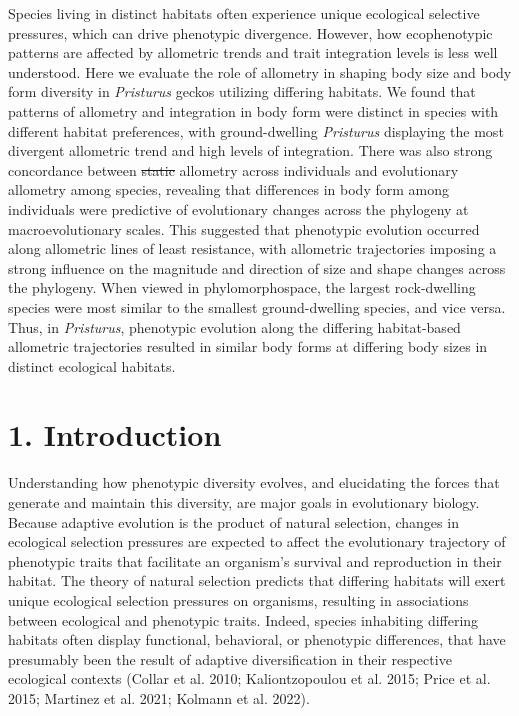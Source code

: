 \documentclass[
  11pt,
]{article}
\providecommand{\DIFaddtex}[1]{{\protect\color{blue}\uwave{#1}}} %
\providecommand{\DIFdeltex}[1]{{\protect\color{red}\sout{#1}}}                      %
\providecommand{\DIFaddbegin}{} %
\providecommand{\DIFaddend}{} %
\providecommand{\DIFdelbegin}{} %
\providecommand{\DIFdelend}{} %
\providecommand{\DIFadd}[1]{\texorpdfstring{\DIFaddtex{#1}}{#1}} %
\providecommand{\DIFdel}[1]{\texorpdfstring{\DIFdeltex{#1}}{}} %
\newcommand{\DIFscaledelfig}{0.5}
\newlength{\DIFdelgraphicswidth} %
\newlength{\DIFdelgraphicsheight} %
\newcommand{\DIFaddincludegraphics}[2][]{{\color{blue}\fbox{\DIFOincludegraphics[#1]{#2}}}} %
\newcommand{\DIFdelincludegraphics}[2][]{%
\sbox{\DIFdelgraphicsbox}{\DIFOincludegraphics[#1]{#2}}%
\settoboxwidth{\DIFdelgraphicswidth}{\DIFdelgraphicsbox} %
\settoboxtotalheight{\DIFdelgraphicsheight}{\DIFdelgraphicsbox} %
\scalebox{\DIFscaledelfig}{%
\parbox[b]{\DIFdelgraphicswidth}{\usebox{\DIFdelgraphicsbox}\\[-\baselineskip] \rule{\DIFdelgraphicswidth}{0em}}\llap{\resizebox{\DIFdelgraphicswidth}{\DIFdelgraphicsheight}{%
\setlength{\unitlength}{\DIFdelgraphicswidth}%
\begin{picture}(1,1)%
\thicklines\linethickness{2pt} %
{\color[rgb]{1,0,0}\put(0,0){\framebox(1,1){}}}%
{\color[rgb]{1,0,0}\put(0,0){\line( 1,1){1}}}%
{\color[rgb]{1,0,0}\put(0,1){\line(1,-1){1}}}%
\end{picture}%
}\hspace*{3pt}}} %
} %
\DeclareRobustCommand{\DIFaddbegin}{\DIFOaddbegin \let\includegraphics\DIFaddincludegraphics} %
\DeclareRobustCommand{\DIFaddend}{\DIFOaddend \let\includegraphics\DIFOincludegraphics} %
\DeclareRobustCommand{\DIFdelbegin}{\DIFOdelbegin \let\includegraphics\DIFdelincludegraphics} %
\DeclareRobustCommand{\DIFdelend}{\DIFOaddend \let\includegraphics\DIFOincludegraphics} %
\begin{document}
Species living in distinct habitats often experience unique ecological
selective pressures, which can drive phenotypic divergence. However, how
ecophenotypic patterns are affected by allometric trends and trait
integration levels is less well understood. Here we evaluate the role of
allometry in shaping body size and body form diversity in
\emph{Pristurus} geckos utilizing differing habitats. We found that
patterns of allometry and integration in body form were distinct in
species with different habitat preferences, with ground-dwelling
\emph{Pristurus} displaying the most divergent allometric trend and high
levels of integration. There was also strong concordance between
\DIFdelbegin \DIFdel{static
}\DIFdelend \DIFaddbegin \DIFadd{intraspecific }\DIFaddend allometry across individuals and evolutionary allometry
among species, revealing that differences in body form among individuals
were predictive of evolutionary changes across the phylogeny at
macroevolutionary scales. This suggested that phenotypic evolution
occurred along allometric lines of least resistance, with allometric
trajectories imposing a strong influence on the magnitude and direction
of size and shape changes across the phylogeny. When viewed in
phylomorphospace, the largest rock-dwelling species were most similar to
the smallest ground-dwelling species, and vice versa. Thus, in
\emph{Pristurus}, phenotypic evolution along the differing habitat-based
allometric trajectories resulted in similar body forms at differing body
sizes in distinct ecological habitats.

\newpage

\hypertarget{introduction}{%
\section{1. Introduction}\label{introduction}}

Understanding how phenotypic diversity evolves, and elucidating the
forces that generate and maintain this diversity, are major goals in
evolutionary biology. Because adaptive evolution is the product of
natural selection, changes in ecological selection pressures are
expected to affect the evolutionary trajectory of phenotypic traits that
facilitate an organism's survival and reproduction in their habitat. The
theory of natural selection predicts that differing habitats will exert
unique ecological selection pressures on organisms, resulting in
associations between ecological and phenotypic traits. Indeed, species
inhabiting differing habitats often display functional, behavioral, or
phenotypic differences, that have presumably been the result of adaptive
diversification in their respective ecological contexts (Collar et al.
2010; Kaliontzopoulou et al. 2015; Price et al. 2015; Martinez et al.
2021; Kolmann et al. 2022). \hfill\break
\end{document}

